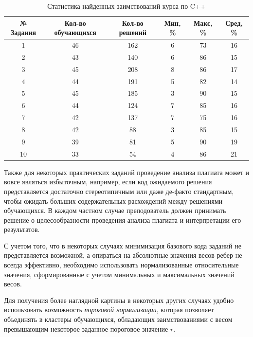 \documentclass[a4paper,14pt]{extarticle}
\begin{document}
\begin{table}[htb]
    \centering
    \begin{tabular}{cccccc}
        \toprule
        № Задания & Кол-во обучающихся & Кол-во решений & Мин, \% & Макс, \% & Сред, \% \\
        \toprule
        1 & 46 & 162 & 6 & 73 & 16 \\
        \midrule
        2 & 43 & 140 & 6 & 86 & 15 \\
        \midrule
        3 & 45 & 208 & 8 & 86 & 17 \\
        \midrule
        4 & 44 & 191 & 5 & 82 & 14 \\
        \midrule
        5 & 45 & 185 & 3 & 90 & 15 \\
        \midrule
        6 & 44 & 124 & 7 & 85 & 16 \\
        \midrule
        7 & 42 & 137 & 7 & 75 & 16 \\
        \midrule
        8 & 42 & 88 & 3 & 85 & 15 \\
        \midrule
        9 & 39 & 81 & 5 & 90 & 19 \\
        \midrule
        10 & 33 & 54 & 4 & 86 & 21 \\
        \bottomrule
    \end{tabular}
    \caption{Статистика найденных заимствований курса по C++}
    \label{tab:cppCourseStats}
\end{table}

Также для некоторых практических заданий проведение анализа плагиата может и вовсе являться избыточным, например, если код ожидаемого решения представляется достаточно стереотипичным или даже де-факто стандартным, чтобы ожидать больших содержательных расхождений между решениями обучающихся. В каждом частном случае преподователь должен принимать решение о целесообразности проведения анализа плагиата и интерпретации его результатов.

С учетом того, что в некоторых случаях минимизация базового кода заданий не представляется возможной, а опираться на абсолютные значения весов ребер не всегда эффективно, необходимо использовать нормализованные относительные значения, сформированные с учетом минимальных и максимальных значений весов.

Для получения более наглядной картины в некоторых других случаях удобно использовать возможность \textit{пороговой нормализации}, которая позволяет объединять в кластеры обучающихся, обладающих заимствованиями с весом превышающим некоторое заданное пороговое значение $r$.
\end{document}

